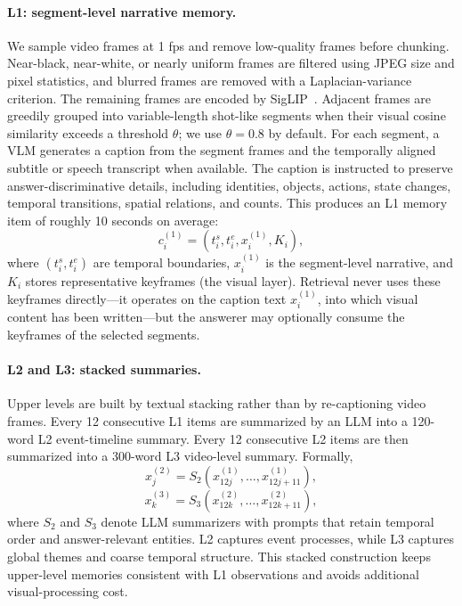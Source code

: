 \documentclass[letterpaper]{article} %
\begin{document}
\paragraph{L1: segment-level narrative memory.}
We sample video frames at 1 fps and remove low-quality frames before chunking. Near-black, near-white, or nearly uniform frames are filtered using JPEG size and pixel statistics, and blurred frames are removed with a Laplacian-variance criterion. The remaining frames are encoded by SigLIP~\citep{zhai2023siglip}. Adjacent frames are greedily grouped into variable-length shot-like segments when their visual cosine similarity exceeds a threshold $\theta$; we use $\theta=0.8$ by default. For each segment, a VLM generates a caption from the segment frames and the temporally aligned subtitle or speech transcript when available. The caption is instructed to preserve answer-discriminative details, including identities, objects, actions, state changes, temporal transitions, spatial relations, and counts. This produces an L1 memory item of roughly 10 seconds on average:
\begin{equation}
    c_i^{(1)}=(t_i^s,t_i^e,x_i^{(1)},K_i),
\end{equation}
where $(t_i^s,t_i^e)$ are temporal boundaries, $x_i^{(1)}$ is the segment-level narrative, and $K_i$ stores representative keyframes (the visual layer). Retrieval never uses these keyframes directly---it operates on the caption text $x_i^{(1)}$, into which visual content has been written---but the answerer may optionally consume the keyframes of the selected segments.

\paragraph{L2 and L3: stacked summaries.}
Upper levels are built by textual stacking rather than by re-captioning video frames. Every 12 consecutive L1 items are summarized by an LLM into a 120-word L2 event-timeline summary. Every 12 consecutive L2 items are then summarized into a 300-word L3 video-level summary. Formally,
\begin{equation}
    x_j^{(2)}=S_2(x_{12j}^{(1)},\ldots,x_{12j+11}^{(1)}),
\end{equation}
\begin{equation}
    x_k^{(3)}=S_3(x_{12k}^{(2)},\ldots,x_{12k+11}^{(2)}),
\end{equation}
where $S_2$ and $S_3$ denote LLM summarizers with prompts that retain temporal order and answer-relevant entities. L2 captures event processes, while L3 captures global themes and coarse temporal structure. This stacked construction keeps upper-level memories consistent with L1 observations and avoids additional visual-processing cost.
\end{document}
